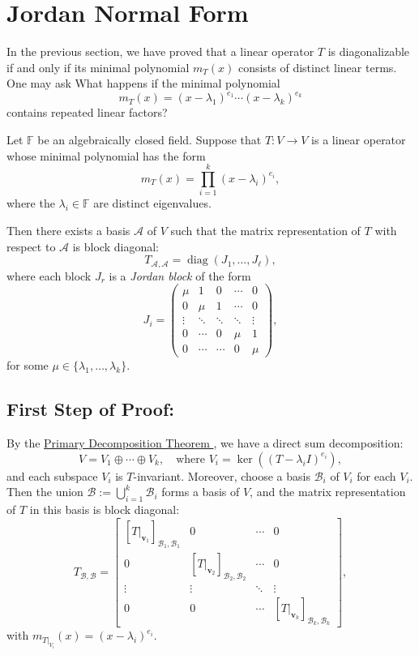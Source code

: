 \section{Jordan Normal Form}

In the previous section, we have proved that a linear operator \( T \) is diagonalizable if and only if its minimal polynomial $m_T(x)$ consists of distinct linear terms. One may ask What happens if the minimal polynomial 
\[ m_T(x) = (x-\lambda_1)^{e_1}\cdots (x-\lambda_k)^{e_k}\] 
contains repeated linear factors? 

\begin{theorem}\label{thm:jordan-normal-form}
Let \( \mathbb{F} \) be an algebraically closed field. Suppose that \( T : V \to V \) is a linear operator whose minimal polynomial has the form
\[
m_T(x) = \prod_{i=1}^k (x - \lambda_i)^{e_i},
\]
where the \( \lambda_i \in \mathbb{F} \) are distinct eigenvalues.

Then there exists a basis \( \mathcal{A} \) of \( V \) such that the matrix representation of \( T \) with respect to \( \mathcal{A} \) is block diagonal:
\[
T_{\mathcal{A}, \mathcal{A}} = \operatorname{diag}(J_1, \ldots, J_\ell),
\]
where each block \( J_r \) is a \emph{Jordan block} of the form
\[
J_i = \begin{pmatrix}
\mu & 1 & 0 & \cdots & 0 \\
0 & \mu & 1 & \cdots & 0 \\
\vdots & \ddots & \ddots & \ddots & \vdots \\
0 & \cdots & 0 & \mu & 1 \\
0 & \cdots & \cdots & 0 & \mu
\end{pmatrix},
\]
for some \( \mu \in \{ \lambda_1, \ldots, \lambda_k \} \).
\end{theorem}

\subsection{First Step of Proof:}
By the \hyperref[thm:primary-decomposition]{Primary Decomposition Theorem }, we have a direct sum decomposition:
\[
V = V_1 \oplus \cdots \oplus V_k,
\quad \text{where } V_i = \ker \left( (T - \lambda_i I)^{e_i} \right),
\]
and each subspace \( V_i \) is \( T \)-invariant.
Moreover, choose a basis \( \mathcal{B}_i \) of \( V_i \) for each $V_i$. Then the union \(\mathcal{B} := \bigcup_{i=1}^k \mathcal{B}_i
\) forms a basis of \( V \), and the matrix representation of \( T \) in this basis is block diagonal:
\[
T_{\mathcal{B}, \mathcal{B}} =
\begin{bmatrix}
[T|_{\mathbf{v}_1}]_{\mathcal{B}_1, \mathcal{B}_1} & 0 & \cdots & 0 \\
0 & [T|_{\mathbf{v}_2}]_{\mathcal{B}_2, \mathcal{B}_2} & \cdots & 0 \\
\vdots & \vdots & \ddots & \vdots \\
0 & 0 & \cdots & [T|_{\mathbf{v}_k}]_{\mathcal{B}_k, \mathcal{B}_k}
\end{bmatrix},
\]
with \( m_{T|_{V_i}}(x) = (x - \lambda_i)^{e_i} \).

